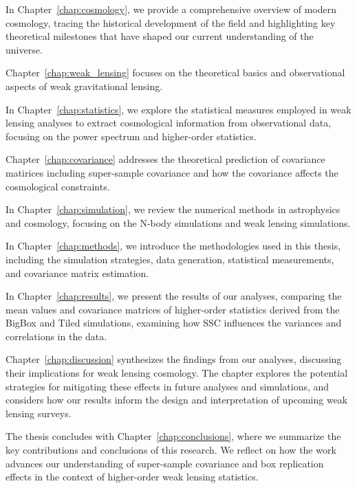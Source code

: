 In Chapter~\ref{chap:cosmology}, we provide a comprehensive overview of modern cosmology, tracing the historical development of the field and highlighting key theoretical milestones that have shaped our current understanding of the universe. 

Chapter~\ref{chap:weak_lensing} focuses on the theoretical basics and observational aspects of weak gravitational lensing. 

In Chapter~\ref{chap:statistics}, we explore the statistical measures employed in weak lensing analyses to extract cosmological information from observational data, focusing on the power spectrum and higher-order statistics. 

Chapter~\ref{chap:covariance} addresses the theoretical prediction of covariance matirices including super-sample covariance and how the covariance affects the cosmological constraints. 

In Chapter~\ref{chap:simulation}, we review the numerical methods in astrophysics and cosmology, focusing on the N-body simulations and weak lensing simulations. 

In Chapter~\ref{chap:methods}, we introduce the methodologies used in this thesis, including the simulation strategies, data generation, statistical measurements, and covariance matrix estimation.

In Chapter~\ref{chap:results}, we present the results of our analyses, comparing the mean values and covariance matrices of higher-order statistics derived from the BigBox and Tiled simulations, examining how SSC influences the variances and correlations in the data.

Chapter~\ref{chap:discussion} synthesizes the findings from our analyses, discussing their implications for weak lensing cosmology. The chapter explores the potential strategies for mitigating these effects in future analyses and simulations, and considers how our results inform the design and interpretation of upcoming weak lensing surveys.

The thesis concludes with Chapter~\ref{chap:conclusions}, where we summarize the key contributions and conclusions of this research. We reflect on how the work advances our understanding of super-sample covariance and box replication effects in the context of higher-order weak lensing statistics.